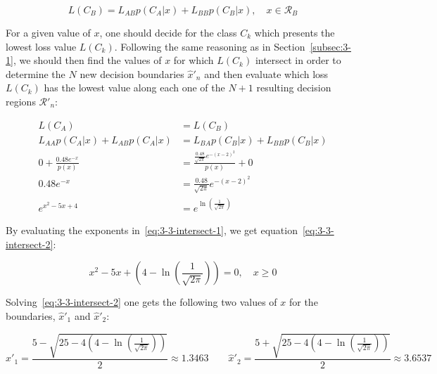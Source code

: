 \documentclass[paper=a4, fontsize=11pt]{scrartcl} %
\numberwithin{equation}{section} %
\numberwithin{figure}{section} %
\numberwithin{table}{section} %
\begin{document}
\begin{equation}
    L(C_B) = L_{AB}p(C_A|x) + L_{BB}p(C_B|x), \quad x \in \mathcal{R}_{B} %
    \label{eq:lossb}
\end{equation}

For a given value of $x$, one should decide for the class $C_k$ which presents 
the lowest loss value $L(C_k)$. Following the same reasoning as in 
Section~\ref{subsec:3-1}, we should then find the values of $x$ for which 
$L(C_k)$ intersect in order to determine the $N$ new decision boundaries 
$\hat{x}'_n$ and then evaluate which loss $L(C_k)$ has the 
lowest value along each one of the $N+1$ resulting decision regions 
$\mathcal{R'}_n$:

\begin{equation}
\begin{split}
    L(C_A) & = L(C_B) \\
    L_{AA}p(C_A|x) + L_{AB}p(C_A|x) & = L_{BA}p(C_B|x) + L_{BB}p(C_B|x) \\
    0 + \frac{\text{0.48}e^{-x}}{p(x)} & = \frac{\frac{\text{0.48}}{\sqrt{2\pi}}e^{-(x-2)^2}}{p(x)} + 0 \\
    \text{0.48}e^{-x} & = \frac{\text{0.48}}{\sqrt{2\pi}}e^{-(x-2)^2} \\
    e^{x^2-5x+4} & = e^{\ln\left(\frac{\text{1}}{\sqrt{2\pi}}\right)}
    \label{eq:3-3-intersect-1}
\end{split}
\end{equation}

By evaluating the exponents in~\ref{eq:3-3-intersect-1}, we get 
equation~\ref{eq:3-3-intersect-2}:

\begin{equation}
    x^2-5x+\left(4 - \ln\left(\frac{\text{1}}{\sqrt{2\pi}}\right)\right) = 0, \quad x \geq 0
    \label{eq:3-3-intersect-2}
\end{equation}

Solving~\ref{eq:3-3-intersect-2} one gets the following two values of $x$ for the 
boundaries, $\hat{x}'_{1}$ and $\hat{x}'_{2}$:

\[ \hat{x}'_{1} = \frac{5 - \sqrt{25 - 4\left(4 - \ln\left(\frac{\text{1}}{\sqrt{2\pi}}\right)\right)}}{2} \approx 1.3463 
    \quad \quad \hat{x}'_{2} = \frac{5 + \sqrt{25 - 4\left(4 - \ln\left(\frac{\text{1}}{\sqrt{2\pi}}\right)\right)}}{2} \approx 3.6537 \]
\end{document}

